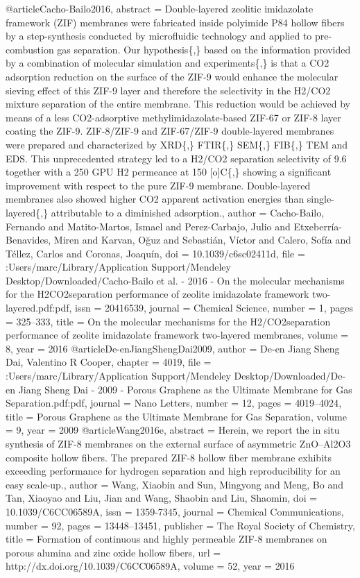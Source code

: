 @article{Cacho-Bailo2016,
abstract = {Double-layered zeolitic imidazolate framework (ZIF) membranes were fabricated inside polyimide P84 hollow fibers by a step-synthesis conducted by microfluidic technology and applied to pre-combustion gas separation. Our hypothesis{\{},{\}} based on the information provided by a combination of molecular simulation and experiments{\{},{\}} is that a CO2 adsorption reduction on the surface of the ZIF-9 would enhance the molecular sieving effect of this ZIF-9 layer and therefore the selectivity in the H2/CO2 mixture separation of the entire membrane. This reduction would be achieved by means of a less CO2-adsorptive methylimidazolate-based ZIF-67 or ZIF-8 layer coating the ZIF-9. ZIF-8/ZIF-9 and ZIF-67/ZIF-9 double-layered membranes were prepared and characterized by XRD{\{},{\}} FTIR{\{},{\}} SEM{\{},{\}} FIB{\{},{\}} TEM and EDS. This unprecedented strategy led to a H2/CO2 separation selectivity of 9.6 together with a 250 GPU H2 permeance at 150 [o]C{\{},{\}} showing a significant improvement with respect to the pure ZIF-9 membrane. Double-layered membranes also showed higher CO2 apparent activation energies than single-layered{\{},{\}} attributable to a diminished adsorption.},
author = {Cacho-Bailo, Fernando and Matito-Martos, Ismael and Perez-Carbajo, Julio and Etxeberr{\'{i}}a-Benavides, Miren and Karvan, Oğuz and Sebasti{\'{a}}n, V{\'{i}}ctor and Calero, Sof{\'{i}}a and T{\'{e}}llez, Carlos and Coronas, Joaqu{\'{i}}n},
doi = {10.1039/c6sc02411d},
file = {:Users/marc/Library/Application Support/Mendeley Desktop/Downloaded/Cacho-Bailo et al. - 2016 - On the molecular mechanisms for the H2CO2separation performance of zeolite imidazolate framework two-layered.pdf:pdf},
issn = {20416539},
journal = {Chemical Science},
number = {1},
pages = {325--333},
title = {{On the molecular mechanisms for the H2/CO2separation performance of zeolite imidazolate framework two-layered membranes}},
volume = {8},
year = {2016}
}
@article{De-enJiangShengDai2009,
author = {{De-en Jiang Sheng Dai}, Valentino R Cooper},
chapter = {4019},
file = {:Users/marc/Library/Application Support/Mendeley Desktop/Downloaded/De-en Jiang Sheng Dai - 2009 - Porous Graphene as the Ultimate Membrane for Gas Separation.pdf:pdf},
journal = {Nano Letters},
number = {12},
pages = {4019--4024},
title = {{Porous Graphene as the Ultimate Membrane for Gas Separation}},
volume = {9},
year = {2009}
}
@article{Wang2016e,
abstract = {Herein, we report the in situ synthesis of ZIF-8 membranes on the external surface of asymmetric ZnO–Al2O3 composite hollow fibers. The prepared ZIF-8 hollow fiber membrane exhibits exceeding performance for hydrogen separation and high reproducibility for an easy scale-up.},
author = {Wang, Xiaobin and Sun, Mingyong and Meng, Bo and Tan, Xiaoyao and Liu, Jian and Wang, Shaobin and Liu, Shaomin},
doi = {10.1039/C6CC06589A},
issn = {1359-7345},
journal = {Chemical Communications},
number = {92},
pages = {13448--13451},
publisher = {The Royal Society of Chemistry},
title = {{Formation of continuous and highly permeable ZIF-8 membranes on porous alumina and zinc oxide hollow fibers}},
url = {http://dx.doi.org/10.1039/C6CC06589A},
volume = {52},
year = {2016}
}
